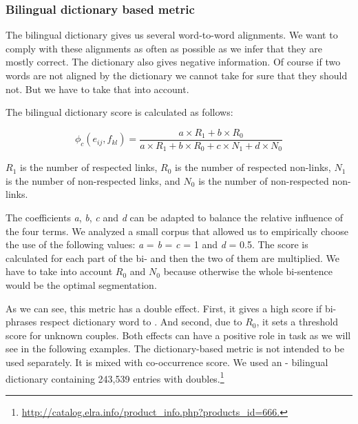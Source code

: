 \documentclass[output=paper,modfonts,nonflat]{langsci/langscibook}
\begin{document}
\subsubsection{Bilingual dictionary based metric}

The bilingual dictionary gives us several word-to-word alignments. We want to comply with these alignments as often as possible as we infer that they are mostly correct. %
The dictionary also gives negative  information. Of course if two words are not aligned by the dictionary we cannot take for sure that they should not. But we have to take that into account.

The bilingual dictionary score is calculated as follows:

\begin{equation}
\phi_c(e_{ij},f_{kl})=\frac{a\times R_1 + b\times R_0}{a\times R_1 + b\times R_0 + c\times N_1 + d\times N_0}
\end{equation}

$R_1$ is the number of respected links, $R_0$ is the number of respected non-links, $N_1$ is the number of non-respected links, and $N_0$ is the number of non-respected non-links.

The coefficients \textit{a}, \textit{b}, \textit{c} and \textit{d} can be adapted to balance the relative influence of the four terms. 
We analyzed a small corpus that allowed us to empirically choose the use of the following values:  \textit{a} = \textit{b} = \textit{c} = 1 and \textit{d} = 0.5. 
The score is calculated for each part of the bi- and then the two of them are multiplied. We have to take into account $R_0$ and $N_0$ because otherwise the whole bi-sentence would be the optimal segmentation.

As we can see, this metric has a double effect. 
First, it gives a high score if bi-phrases respect dictionary word to . 
And second, due to $R_0$, it sets a threshold score for unknown couples. 
Both effects can have a positive role in  task as we will see in the following examples. The dictionary-based metric is not intended to be used separately. It is mixed with 
co-occurrence score. We used an - bilingual dictionary containing 243,539 entries with doubles.\footnote{\url{http://catalog.elra.info/product_info.php?products_id=666.}}
\end{document}
